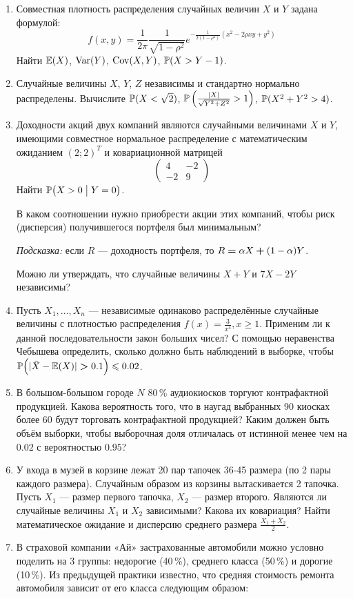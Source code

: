 \begin{enumerate}

\item Совместная плотность распределения случайных величин $X$ и $Y$ задана формулой:
\[
f(x,y)=\frac{1}{2\pi}\frac{1}{\sqrt{1-\rho^2}}e^{-\frac{1}{2(1-\rho^2)}\left(x^2-2\rho xy+y^2\right)}
\]
Найти $\E(X)$, $\Var(Y)$, $\Cov(X,Y)$, $\P(X>Y-1)$.

\item Случайные величины $X$, $Y$, $Z$ независимы и стандартно нормально распределены.
Вычислите
$\P(X<\sqrt2)$, $\P\left( \frac{|X|}{\sqrt{Y^2+Z^2}}>1\right)$, $\P(X^2+Y^2>4)$.

\item Доходности акций двух компаний являются случайными величинами $X$ и $Y$,
имеющими совместное нормальное распределение с математическим ожиданием
$(2;2)^T$ и ковариационной матрицей
\[
\begin{pmatrix}
4 & -2 \\
-2 & 9
\end{pmatrix}
\]
Найти $\P\bigl(X>0 \bigm| Y=0\bigr)$.

В каком соотношении нужно приобрести акции этих компаний, чтобы риск (дисперсия)
получившегося портфеля был минимальным?

\emph{Подсказка:} если $R$ — доходность портфеля, то $R\hm=\alpha X\hm+(1-\alpha)Y$.

Можно ли утверждать, что случайные величины $X+Y$ и $7X-2Y$ независимы?
\item Пусть $X_1, \ldots, X_n$ — независимые одинаково распределённые случайные
величины с плотностью распределения $f(x)=\frac{3}{x^4}, x\geqslant 1$. Применим
ли к данной последовательности закон больших чисел? С помощью неравенства Чебышева
определить, сколько должно быть наблюдений в выборке, чтобы $\P\Bigl(|\bar{X} -\E(X)|\hm>0.1 \Big)\leqslant 0.02$.
\item В большом-большом городе $N$ 80\,\% аудиокиосков торгуют контрафактной продукцией.
Какова вероятность того, что  в наугад выбранных 90 киосках более 60 будут торговать
контрафактной  продукцией? Каким должен быть объём выборки, чтобы выборочная доля
отличалась от истинной менее чем на $0.02$ с вероятностью $0.95$?
\item У входа в музей в корзине лежат 20 пар тапочек 36-45 размера (по 2 пары
каждого размера). Случайным образом из корзины вытаскивается 2 тапочка. Пусть
$X_1$ — размер первого тапочка, $X_2$ — размер второго. Являются ли случайные
величины $X_1$ и $X_2$ зависимыми? Какова их ковариация? Найти математическое
ожидание и дисперсию среднего размера $\frac{X_1 + X_2}{2}$.
\item В страховой компании «Ай» застрахованные автомобили можно условно поделить
на 3 группы: недорогие (40\,\%), среднего класса (50\,\%) и дорогие (10\,\%).
Из предыдущей практики известно, что средняя стоимость ремонта автомобиля зависит
от его класса следующим образом:


\end{enumerate}
